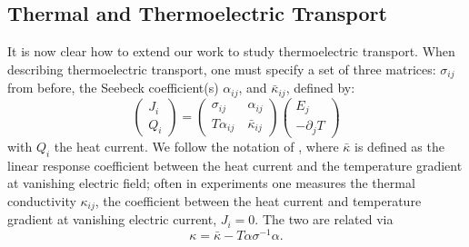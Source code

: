 \documentclass[10pt, oneside]{book}
\begin{document}
\begin{doublespace}
\section{Thermal and Thermoelectric Transport}\label{sec:therm}
It is now clear how to extend our work to study thermoelectric transport.   When describing thermoelectric transport, one must specify a set of three matrices:  $\sigma_{ij}$ from before, the Seebeck coefficient(s) $\alpha_{ij}$, and $\bar\kappa_{ij}$, defined by: \begin{equation}
\left(\begin{array}{c} J_i \\ Q_i \end{array}\right) = \left(\begin{array}{cc} \sigma_{ij} &\ \alpha_{ij} \\ T\alpha_{ij} &\ \bar\kappa_{ij} \end{array}\right) \left(\begin{array}{c} E_j \\ -\partial_j T \end{array}\right)
\end{equation} with $Q_i$ the heat current.     We follow the notation of \cite{hkms}, where $\bar\kappa$ is defined as the linear response coefficient between the heat current and the temperature gradient at vanishing electric field;  often in experiments one measures the thermal conductivity $\kappa_{ij}$,  the coefficient between the heat current and temperature gradient at vanishing electric current, $J_i =0$.   The two are related via  \begin{equation}
\kappa = \bar\kappa - T \alpha \sigma^{-1}\alpha.   \label{eq64}
\end{equation}



\end{doublespace}
\end{document}
